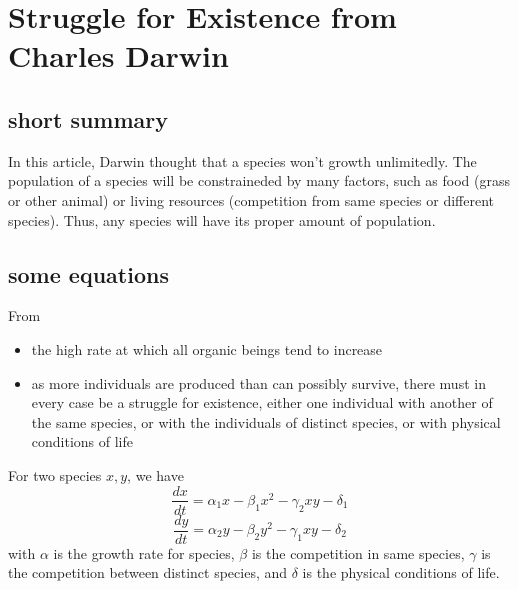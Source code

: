 \documentclass [12pt] {article}
\begin{document}
	\section {Struggle for Existence from Charles Darwin}
	\subsection {short summary}
	In this article, Darwin thought that a species won't growth unlimitedly. The population of a species will be constraineded by many factors, such as food (grass or other animal) or living resources (competition from same species or different species). Thus, any species will have its proper amount of population.
	\subsection {some equations}
	From
	\begin {itemize}
		\item the high rate at which all organic beings tend to increase
		\item as more individuals are produced than can possibly survive, there must in every case be a struggle for existence, either one individual with another of the same species, or with the individuals of distinct species, or with physical conditions of life
	\end {itemize}
	For two species $x, y$, we have
	\begin {equation}
	\frac{dx}{dt} = \alpha_{1}x - \beta_{1}x^{2} - \gamma_{2}xy - \delta_{1}
	\end {equation}
	\begin {equation}
	\frac{dy}{dt} = \alpha_{2}y - \beta_{2}y^{2} - \gamma_{1}xy - \delta_{2}
	\end {equation}
	with $\alpha$ is the growth rate for species, $\beta$ is the competition in same species, $\gamma$ is the competition between distinct species, and $\delta$ is the physical conditions of life.
\end{document}
